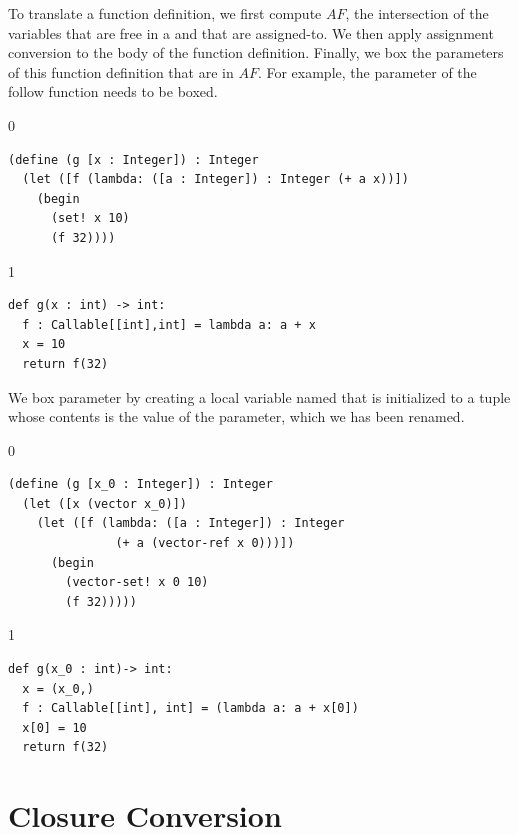 \documentclass[7x10,nocrop]{TimesAPriori_MIT}%
\def\racketEd{0}
\def\pythonEd{1}
\def\edition{1}
\begin{document}
To translate a function definition, we first compute $\mathit{AF}$,
the intersection of the variables that are free in a  and
that are assigned-to. We then apply assignment conversion to the body
of the function definition. Finally, we box the parameters of this
function definition that are in $\mathit{AF}$. For example,
the parameter  of the follow function 
needs to be boxed.
{\if\edition\racketEd
\begin{lstlisting}
(define (g [x : Integer]) : Integer
  (let ([f (lambda: ([a : Integer]) : Integer (+ a x))])
    (begin
      (set! x 10)
      (f 32))))
\end{lstlisting}
\fi}
%
{\if\edition\pythonEd
\begin{lstlisting}
def g(x : int) -> int:
  f : Callable[[int],int] = lambda a: a + x
  x = 10
  return f(32)
\end{lstlisting}
\fi}
%
\noindent We box parameter  by creating a local variable named
 that is initialized to a tuple whose contents is the value of
the parameter, which we has been renamed.
%
{\if\edition\racketEd
\begin{lstlisting}
(define (g [x_0 : Integer]) : Integer
  (let ([x (vector x_0)])
    (let ([f (lambda: ([a : Integer]) : Integer
               (+ a (vector-ref x 0)))])
      (begin 
        (vector-set! x 0 10)
        (f 32)))))
\end{lstlisting}
\fi}
%
{\if\edition\pythonEd
\begin{lstlisting}
def g(x_0 : int)-> int:
  x = (x_0,)
  f : Callable[[int], int] = (lambda a: a + x[0])
  x[0] = 10
  return f(32)
\end{lstlisting}
\fi}


\section{Closure Conversion}
\label{sec:closure-conversion}
\end{document}
